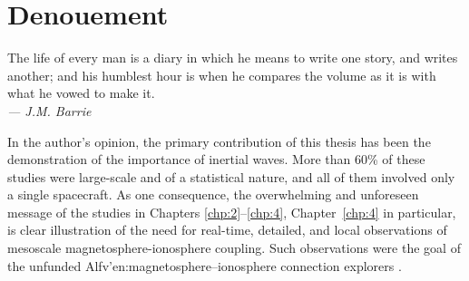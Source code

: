 
  \chapter{Denouement}
  \label{chp:outro}

  \begin{flushright}
    \begin{minipage}[]{0.55\linewidth}
      \begin{flushright}
        The life of every man is a diary in which he means to write one story,
        and writes another; and his humblest hour is when he compares the volume
        as it is with what he vowed to make it. \\{\small \emph{--- J.M. Barrie}
        }
      \end{flushright}
    \end{minipage}
  \end{flushright}
  \vspace{\baselineskip}


  In the author's opinion, the primary contribution of this thesis has been the
  demonstration of the importance of inertial \Alf waves. More than 60\% of
  these studies were large-scale and of a statistical nature, and all of them
  involved only a single spacecraft. As one consequence, the overwhelming and
  unforeseen message of the studies in Chapters \ref{chp:2}--\ref{chp:4},
  Chapter~\ref{chp:4} in particular, is clear illustration of the need for
  real-time, detailed, and local observations of mesoscale
  magnetosphere-ionosphere coupling. Such observations were the goal of the
  unfunded Alfv'{e}n:magnetosphere--ionosphere connection explorers
  \citep{Berthomier2011}.

